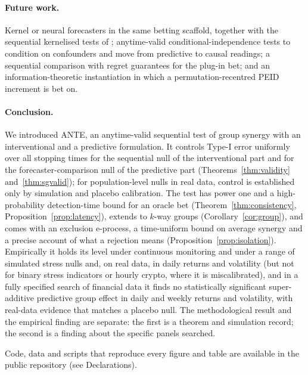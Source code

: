 \documentclass[pdflatex,sn-mathphys-ay]{sn-jnl}%
\theoremstyle{thmstyleone}%
\theoremstyle{thmstyletwo}%
\theoremstyle{thmstylethree}%
\begin{document}
\paragraph{Future work.} Kernel or neural forecasters in the same betting scaffold, together with the sequential kernelised tests of \citet{podkopaev2023}; anytime-valid conditional-independence tests \citep{grunwald2024ci} to condition on confounders and move from predictive to causal readings;
a sequential comparison with regret guarantees for the plug-in bet; and an information-theoretic instantiation in which a permutation-recentred PEID increment is bet on.

\paragraph{Conclusion.} We introduced ANTE, an anytime-valid sequential test of group synergy with an interventional and a predictive formulation. It controls Type-I error uniformly over all stopping times for the sequential null of the interventional part and for the forecaster-comparison null of the predictive part (Theorems~\ref{thm:validity} and~\ref{thm:sgvalid}); for population-level nulls in real data, control is established only by simulation and placebo calibration. The test has power one and a high-probability detection-time bound for an oracle bet (Theorem~\ref{thm:consistency}, Proposition~\ref{prop:latency}), extends to $k$-way groups (Corollary~\ref{cor:group}), and comes with an exclusion e-process, a time-uniform bound on average synergy and a precise account of what a rejection means (Proposition~\ref{prop:isolation}).
Empirically it holds its level under continuous monitoring and under a range of simulated stress nulls and, on real data, in daily returns and volatility (but not for binary stress indicators or hourly crypto, where it is miscalibrated), and in a fully specified search of financial data it finds no statistically significant super-additive predictive group effect in daily and weekly returns and volatility, with real-data evidence that matches a placebo null. The methodological result and the empirical finding are separate:
the first is a theorem and simulation record; the second is a finding about the specific panels searched.

\backmatter

Code, data and scripts that reproduce every figure and table are available in the
public repository (see Declarations).
\end{document}
